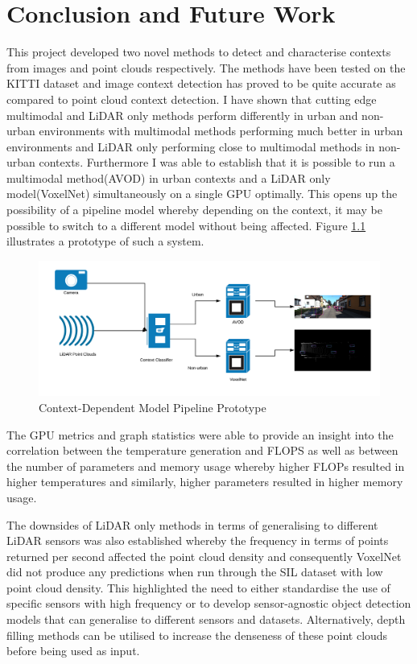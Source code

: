 %
%
\let\textcircled=\pgftextcircled
\chapter{Conclusion and Future Work}
\label{chap:fw}

This project developed two novel methods to detect and characterise contexts from images and point clouds respectively. The methods have been tested on the KITTI dataset and image context detection has proved to be quite accurate as compared to point cloud context detection.
I have shown that cutting edge multimodal and LiDAR only methods perform differently in urban and non-urban environments with multimodal methods performing much better in urban environments and LiDAR only performing close to multimodal methods in non-urban contexts. Furthermore I was able to establish that it is possible to run a multimodal method(AVOD) in urban contexts and a LiDAR only model(VoxelNet) simultaneously on a single GPU optimally. 
This opens up the possibility of a pipeline model whereby depending on the context, it may be possible to switch to a different model without being affected. Figure \ref{fig:pipeline} illustrates a prototype of such a system. 
\begin{figure}[h] %
	\centering 
	\includegraphics[width=\linewidth]{images/pipeline}	
	\caption{Context-Dependent Model Pipeline Prototype}
	\label{fig:pipeline}

\end{figure}
The GPU metrics and graph statistics were able to provide an insight into the correlation between the temperature generation and FLOPS as well as between the number of parameters and memory usage whereby higher FLOPs resulted in higher temperatures and similarly, higher parameters resulted in higher memory usage. 

The downsides of LiDAR only methods in terms of generalising to different LiDAR sensors was also established whereby the frequency in terms of points returned per second affected the point cloud density and consequently VoxelNet did not produce any predictions when run through the SIL dataset with low point cloud density. This highlighted the need to either standardise the use of specific sensors with high frequency or to develop sensor-agnostic object detection models that can generalise to different sensors and datasets. Alternatively, depth filling methods can be utilised to increase the denseness of these point clouds before being used as input\cite{depth}. 

